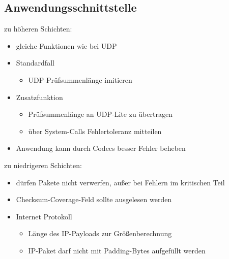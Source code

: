 \documentclass{beamer}
\begin{document}
\subsection{Anwendungsschnittstelle}
\begin{frame}
zu höheren Schichten:
\begin{itemize}
\item gleiche Funktionen wie bei UDP
\item Standardfall
	\begin{itemize}
	\item UDP-Prüfsummenlänge imitieren
	\end{itemize}
\item Zusatzfunktion 
	\begin{itemize}
	\item Prüfsummenlänge an UDP-Lite zu übertragen
	\item über System-Calls Fehlertoleranz mitteilen
	\end{itemize}
\item Anwendung kann durch Codecs besser Fehler beheben
\end{itemize}

zu niedrigeren Schichten:
\begin{itemize}
\item dürfen Pakete nicht verwerfen, außer bei Fehlern im kritischen Teil
\item Checksum-Coverage-Feld sollte ausgelesen werden
\end{itemize}
\begin{itemize}
\item Internet Protokoll
	\begin{itemize}
	\item Länge des IP-Payloads zur Größenberechnung
	\item IP-Paket darf nicht mit Padding-Bytes aufgefüllt werden
	\end{itemize}
\end{itemize}
\end{frame}

\end{document}

